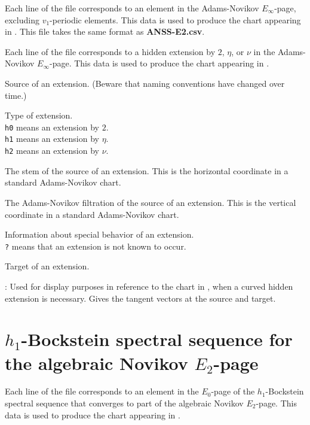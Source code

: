 \documentclass{amsart}
\begin{document}
Each line of the file corresponds to an element in the
Adams-Novikov $E_\infty$-page, excluding $v_1$-periodic elements.
This data is used to produce the
chart appearing in \cite{IWX19d}.
This file takes the same format as
\textbf{ANSS-E2.csv}.

\newpage

Each line of the file corresponds to a hidden extension by
$2$, $\eta$, or $\nu$
in the Adams-Novikov $E_\infty$-page.  This data is used to produce the
chart appearing in \cite{IWX19d}.

  Source of an extension.
(Beware that naming conventions have changed over time.)

 Type of extension. \\
\texttt{h0} means an extension by $2$. \\
\texttt{h1} means an extension by $\eta$. \\
\texttt{h2} means an extension by $\nu$.

 The stem of the source of an extension.  This is the
horizontal coordinate in a standard Adams-Novikov chart.

 The Adams-Novikov filtration of 
the source of an extension.  This is the vertical coordinate in a standard 
Adams-Novikov chart.

 Information about special behavior of an extension. \\
\texttt{?} means that an extension is not known to occur.

 Target of an extension.

:
Used for display purposes in reference to the chart in \cite{IWX19d},
when a curved hidden extension is necessary.
Gives the tangent vectors at the source and target.

\newpage

\section{$h_1$-Bockstein spectral sequence for the 
algebraic Novikov $E_2$-page}

Each line of the file corresponds to an element in the
$E_0$-page of the 
$h_1$-Bockstein spectral sequence that converges to part of the
algebraic Novikov $E_2$-page.
This data is used to produce the chart appearing in
\cite{IWX19a}.
\end{document}
